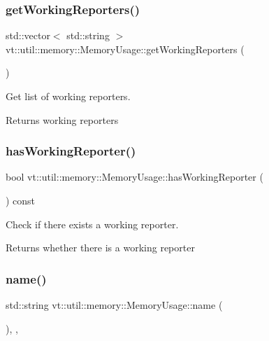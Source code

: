 \subsubsection{\texorpdfstring{get\+Working\+Reporters()}{getWorkingReporters()}}
{\footnotesize\ttfamily std\+::vector$<$ std\+::string $>$ vt\+::util\+::memory\+::\+Memory\+Usage\+::get\+Working\+Reporters (\begin{DoxyParamCaption}{ }\end{DoxyParamCaption})}



Get list of working reporters. 

\begin{DoxyReturn}{Returns}
working reporters 
\end{DoxyReturn}
\mbox{\label{structvt_1_1util_1_1memory_1_1_memory_usage_aee12dfad3c08673967dd1fcd6a6adfb5}} 
\subsubsection{\texorpdfstring{has\+Working\+Reporter()}{hasWorkingReporter()}}
{\footnotesize\ttfamily bool vt\+::util\+::memory\+::\+Memory\+Usage\+::has\+Working\+Reporter (\begin{DoxyParamCaption}{ }\end{DoxyParamCaption}) const}



Check if there exists a working reporter. 

\begin{DoxyReturn}{Returns}
whether there is a working reporter 
\end{DoxyReturn}
\mbox{\label{structvt_1_1util_1_1memory_1_1_memory_usage_abd58d8e05874fa3da64e15fef0b9e87f}} 
\subsubsection{\texorpdfstring{name()}{name()}}
{\footnotesize\ttfamily std\+::string vt\+::util\+::memory\+::\+Memory\+Usage\+::name (\begin{DoxyParamCaption}{ }\end{DoxyParamCaption})\hspace{0.3cm}{\ttfamily [inline]}, {\ttfamily [override]}, {\ttfamily [virtual]}}



